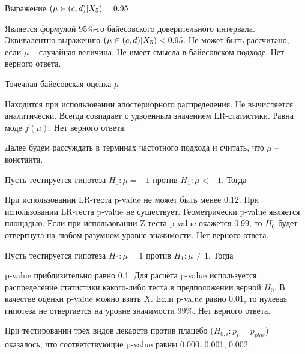 \documentclass[10pt, a4paper]{exam}
\let\P\relax
\DeclareMathOperator{\P}{\mathbb{P}}
\begin{document}
\begin{questions}
		\question Выражение $\P(\mu \in (c, d) | X_5) = 0.95$
		\begin{choices}
			\choice Является формулой $95\%$-го байесовского доверительного интервала.
			\choice Эквивалентно выражению $\P(\mu \in (c, d) | X_5) < 0.95$.
			\choice Не может быть рассчитано, если $\mu$ -- случайная величина.
			\choice Не имеет смысла в байесовском подходе.
			\choice Нет верного ответа.
		\end{choices}
	
		\question Точечная байесовская оценка $\mu$
		\begin{choices}
			\choice Находится при использовании апостериорного распределения.
			\choice Не вычисляется аналитически.
			\choice Всегда совпадает с удвоенным значением LR-статистики.
			\choice Равна моде $f(\mu)$.
			\choice Нет верного ответа.
		\end{choices}
		\vspace{1em}
	
		Далее будем рассуждать в терминах частотного подхода и считать, что $\mu$ -- константа.
		\vspace{1em}
		
		\question Пусть тестируется гипотеза $H_0: \mu = -1$ против $H_1: \mu < -1$. Тогда
		\begin{choices}
			\choice При использовании LR-теста p-value не может быть менее 0.12.
			\choice При использовании LR-теста p-value не существует.
			\choice Геометрически p-value является площадью.
			\choice Если при использовании Z-теста p-value окажется 0.99, то $H_0$ будет отвергнута на любом разумном уровне значимости.
			\choice Нет верного ответа.
		\end{choices}
	
		\question Пусть тестируется гипотеза $H_0: \mu = 1$ против $H_1: \mu \ne 1$. Тогда
		\begin{choices}
			\choice p-value приблизительно равно 0.1.
			\choice Для расчёта p-value используется распределение статистики какого-либо теста в предположении верной $H_0$.
			\choice В качестве оценки p-value можно взять $\bar{X}$.
			\choice Если p-value равно 0.01, то нулевая гипотеза не отвергается на уровне значимости 99\%.
			\choice Нет верного ответа.
		\end{choices}
	\end{questions}
	
	При тестировании трёх видов лекарств против плацебо ($H_{0,i}: p_i = p_{plac}$) оказалось, что соответствующие p-value равны 0.000, 0.001, 0.002.
	
\end{document}

